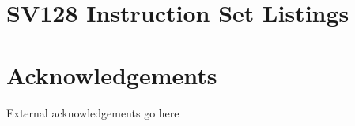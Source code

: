 \documentclass{article}
\begin{document}
\clearpage
\section{SV128 Instruction Set Listings}
\label{sec:SV128InstructionSetListings}

\newpage
\section*{Acknowledgements}
\label{Acknowledgements}

External acknowledgements go here

\newpage
{}



%
\end{document}
